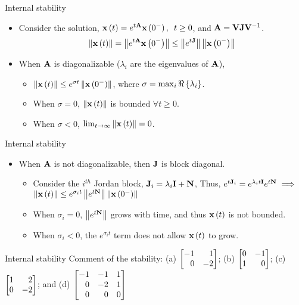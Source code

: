 \documentclass[aspectratio=169]{beamer}
\def\mf{\ensuremath\mathbf}
\def\lp{\ensuremath\left(}
\def\rp{\ensuremath\right)}
\def\lV{\ensuremath\left\lVert}
\def\rV{\ensuremath\right\rVert}
\def\lc{\ensuremath\left\{}
\def\rc{\ensuremath\right\}}
\def\bmx{\ensuremath\begin{bmatrix*}[r]}
\def\emx{\ensuremath\end{bmatrix*}}
\newcommand{\ct}[1]{\lp #1\rp}
\begin{document}
\begin{frame}[t]{Internal stability}
\begin{itemize}
    \item Consider the solution, $\mf{x}\ct{t} = e^{t\mf{A}}\mf{x}\ct{0^-}, \,\,\, t \geq 0$, and $\mf{A} = \mf{V}\mf{J}\mf{V}^{-1}$.
    \[ \lV \mf{x}\ct{t} \rV = \lV e^{t\mf{A}}\mf{x}\ct{0^-} \rV \leq \lV e^{t\mf{J}} \rV \lV \mf{x}\ct{0^-} \rV\]

    \item When $\mf{A}$ is diagonalizable ($\lambda_i$ are the eigenvalues of $\mf{A}$),
    \begin{itemize}
        \item $ \lV \mf{x}\ct{t} \rV \leq  e^{\sigma t} \lV \mf{x}\ct{0^-} \rV$, where $\sigma = \max_i \Re \lc \lambda_i \rc$.
        \item When $\sigma = 0$, $\lV \mf{x}\ct{t}\rV$ is bounded $\forall t \geq 0$.
        \item When $\sigma < 0$, $\lim_{t \to \infty} \lV \mf{x}\ct{t}\rV = 0$.
    \end{itemize}\vspace{0.2cm}
\end{itemize}
\end{frame}


\begin{frame}[t]{Internal stability}
\begin{itemize}
    \item When $\mf{A}$ is not diagonalizable, then $\mf{J}$ is block diagonal.
    \begin{itemize}
        \item Consider the $i^{th}$ Jordan block, $\mf{J}_i = \lambda_i \mf{I} + \mf{N}$, Thus, $e^{t\mf{J}_i} = e^{\lambda_i t\mf{I}}e^{t\mf{N}} \implies $ $ \lV \mf{x}\ct{t} \rV \leq e^{\sigma_i t} \lV e^{t\mf{N}} \rV \lV \mf{x}\ct{0^-} \rV$

        \item When $\sigma_i = 0$, $\lV e^{t\mf{N}} \rV$ grows with time, and thus $\mf{x}\ct{t}$ is not bounded. 

        \item When $\sigma_i < 0$, the $e^{\sigma_i t}$ term does not allow $\mf{x}\ct{t}$ to grow. 
    \end{itemize}
\end{itemize}
\end{frame}
 

\begin{frame}[t]{Internal stability}
Comment of the stability: (a) $\bmx -1 & 1\\ 0 & -2\emx$; (b) $\bmx 0 & -1\\ 1 & 0\emx$; (c) $\bmx 1 & 2\\ 0 & -2\emx$;  and (d) $\bmx -1 & -1 & 1\\ 0 & -2 & 1\\ 0 & 0 & 0\emx$
\end{frame}
 
\end{document}
